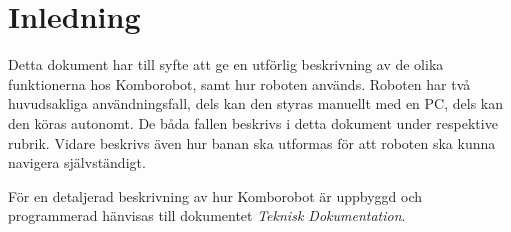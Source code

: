 
%
%


\section{Inledning}
Detta dokument har till syfte att ge en utförlig beskrivning av de olika funktionerna hos Komborobot, samt hur roboten används. Roboten har två huvudsakliga användningsfall, dels kan den styras manuellt med en PC, dels kan den köras autonomt. De båda fallen beskrivs i detta dokument under respektive rubrik. Vidare beskrivs även hur banan ska utformas för att roboten ska kunna navigera självständigt. 

För en detaljerad beskrivning av hur Komborobot är uppbyggd och programmerad hänvisas till dokumentet \emph{Teknisk Dokumentation}.


